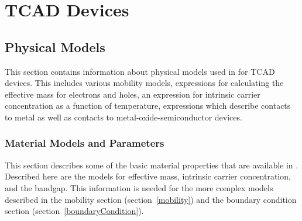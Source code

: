 



\clearpage
\section{TCAD Devices}


\newpage
\subsection{Physical Models}

This section contains information about physical models used in \Xyce{}
for TCAD devices.  This includes various mobility models, expressions
for calculating the effective mass for electrons and holes, an expression
for intrinsic carrier concentration as a function of temperature,
expressions which describe contacts to metal as well as contacts to
metal-oxide-semiconductor devices.

\subsubsection{Material Models and Parameters}
\label{material}

This section describes some of the basic material properties that are 
available in \Xyce{}.  Described here are the models for effective mass,
intrinsic carrier concentration, and the bandgap.  This information is needed
for the more complex models described in the mobility section
(section~\ref{mobility}) and the boundary condition section
(section~\ref{boundaryCondition}).

